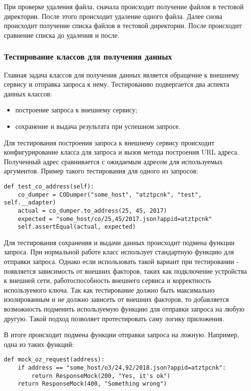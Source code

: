 При проверке удаления файла, сначала происходит получение файлов в тестовой директории.
После этого происходит удаление одного файла.
Далее снова происходит получение списка файлов в тестовой директории.
После происходит сравнение списка до удаления и после.

\subsubsection{Тестирование классов для получения данных}

Главная задача классов для получения данных является обращение к внешнему сервису и отправка запроса к нему.
Тестированию подвергается два аспекта данных классов:
\begin{itemize}
    \item построение запроса к внешнему сервису;
    \item сохранение и выдача результата при успешном запросе.
\end{itemize}

Для тестирования построения запроса к внешнему сервису происходит конфигурирование класса для запроса и вызов метода построения URL адреса.
Полученный адрес сравнивается с ожидаемым адресом для используемых аргументов.
Пример такого тестирования для одного из запросов:

\begin{lstlisting}
def test_co_address(self):
    co_dumper = CODumper("some_host", "atztpcnk", "test", self.__adapter)
    actual = co_dumper.to_address(25, 45, 2017)
    expected = "some_host/co/25,45/2017.json?appid=atztpcnk"
    self.assertEqual(actual, expected)
\end{lstlisting}

Для тестирования сохранения и выдачи данных происходит подмена функции запроса.
При нормальной работе класс использует стандартную функцию для отправки запроса.
Однако если использовать такой вариант при тестировании - появляется зависимость от внешних факторов, таких как подключение устройства к внешней сети, работоспособность внешнего сервиса и корректность используемого ключа.
Так как тестирование должно быть максимально изолированным и не должно зависеть от внешних факторов, то добавляется возможность подменить используемую функцию для отправки запроса на любую другую.
Такой подход позволяет протестировать саму логику приложения.

В итоге происходит подмена функции отправки запроса на ложную.
Например, одна из таких функций:
\begin{lstlisting}
def mock_oz_request(address):
    if address == "some_host/o3/24,92/2018.json?appid=atztpcnk":
        return ResponseMock(200, "Yes, it's ok")
    return ResponseMock(400, "Something wrong")
\end{lstlisting}

